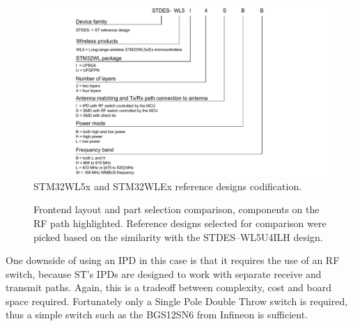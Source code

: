 \begin{figure}
    \includegraphics[width=\textwidth]{fig/STDES-xxxxxxx.png}
    \caption{\label{fig:reference-design-codification}STM32WL5x and STM32WLEx reference designs codification.}
\end{figure}

\begin{figure}
    \centering
    \hfil
    \hfil
    \caption{\label{fig:frontend-comparison}Frontend layout and part selection comparison, components on the RF path highlighted. Reference designs selected for comparison were picked based on the similarity with the STDES--WL5U4ILH design.}
\end{figure}

One downside of using an IPD in this case is that it requires the use of an RF switch, because ST's IPDs are designed to work with separate receive and transmit paths. Again, this is a tradeoff between complexity, cost and board space required. Fortunately only a Single Pole Double Throw switch is required, thus a simple switch such as the BGS12SN6 from Infineon \cite{infineon_technologies_bgs12sn6_2024} is sufficient.

